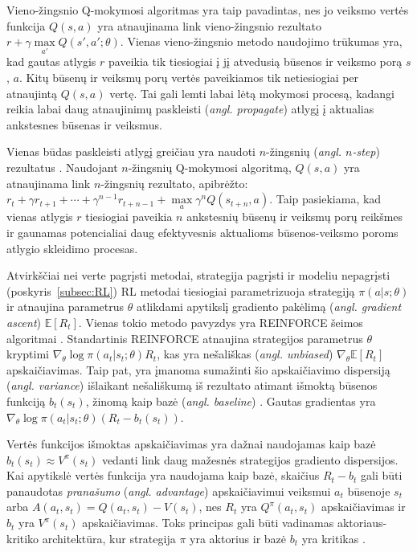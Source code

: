 \documentclass{VUMIFPSbakalaurinis}
\begin{document}
{	Vieno-žingsnio Q-mokymosi algoritmas yra taip pavadintas, nes jo veiksmo vertės funkcija \(Q(s, a)\) yra atnaujinama link vieno-žingsnio rezultato \(r + \gamma \max\limits_{a'} Q(s', a'; \theta) \). Vienas vieno-žingsnio metodo naudojimo trūkumas yra, kad gautas atlygis \(r\) paveikia tik tiesiogiai į jį atvedusią būsenos ir veiksmo porą \(s\), \(a\). Kitų būsenų ir veiksmų porų vertės paveikiamos tik netiesiogiai per atnaujintą \(Q(s, a)\) vertę. Tai gali lemti labai lėtą mokymosi procesą, kadangi reikia labai daug atnaujinimų paskleisti (\textit{angl. propagate}) atlygį į aktualias ankstesnes būsenas ir veiksmus.\par
	
	Vienas būdas paskleisti atlygį greičiau yra naudoti \(n\)-žingsnių (\textit{angl. \(n\)-step}) rezultatus \cite{watkins, peng_williams_1994}. Naudojant \(n\)-žingsnių Q-mokymosi algoritmą, \(Q(s, a)\) yra atnaujinama link \(n\)-žingsnių rezultato, apibrėžto: \(r_t + \gamma r_{t+1} + \cdots + \gamma^{n-1} r_{t+n-1} + \max\limits_a \gamma^n Q(s_{t+n}, a) \). Taip pasiekiama, kad vienas atlygis \(r\) tiesiogiai paveikia \(n\) ankstesnių būsenų ir veiksmų porų reikšmes ir gaunamas potencialiai daug efektyvesnis aktualioms būsenos-veiksmo poroms atlygio skleidimo procesas.\par
	
	Atvirkščiai nei verte pagrįsti metodai, strategija pagrįsti ir modeliu nepagrįsti (poskyris~\ref{subsec:RL}) RL metodai tiesiogiai parametrizuoja strategiją \(\pi(a|s;\theta)\) ir atnaujina parametrus \(\theta\) atlikdami apytikslį gradiento pakėlimą (\textit{angl. gradient ascent}) \(\mathbb{E}[R_t]\). Vienas tokio metodo pavyzdys yra REINFORCE šeimos algoritmai \cite{williams_1992}. Standartinis REINFORCE atnaujina strategijos parametrus \(\theta\) kryptimi \(\nabla_\theta \log \pi(a_t|s_t; \theta)R_t\), kas yra nešališkas (\textit{angl. unbiased}) \(\nabla_\theta \mathbb{E}[R_t] \) apskaičiavimas. Taip pat, yra įmanoma sumažinti šio apskaičiavimo dispersiją (\textit{angl. variance}) išlaikant nešališkumą iš rezultato atimant išmoktą būsenos funkciją \(b_t(s_t)\), žinomą kaip bazė (\textit{angl. baseline}) \cite{williams_1992}. Gautas gradientas yra \(\nabla_\theta \log \pi(a_t|s_t; \theta)(R_t - b_t(s_t))\).\par
	
	Vertės funkcijos išmoktas apskaičiavimas yra dažnai naudojamas kaip bazė \(b_t(s_t) \approx V^\pi(s_t) \) vedanti link daug mažesnės strategijos gradiento dispersijos. Kai apytikslė vertės funkcija yra naudojama kaip bazė, skaičius \(R_t - b_t\) gali būti panaudotas \textit{pranašumo} (\textit{angl. advantage}) apskaičiavimui veiksmui \(a_t\) būsenoje \(s_t\) arba \(A(a_t, s_t) = Q(a_t, s_t) - V(s_t)\), nes \(R_t\) yra \(Q^\pi (a_t, s_t)\) apskaičiavimas ir \(b_t\) yra \(V^\pi(s_t)\) apskaičiavimas. Toks principas gali būti vadinamas aktoriaus-kritiko architektūra, kur strategija \(\pi\) yra aktorius ir bazė \(b_t\) yra kritikas \cite{rl_intro_book}.
}
\end{document}
